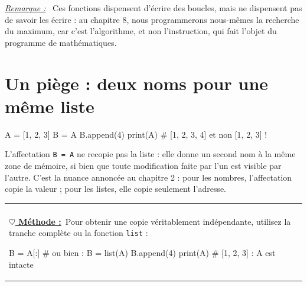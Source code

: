 \documentclass[a4paper,11pt,openany]{book}
\makeatletter
\newcommand{\code}[1]{\texttt{\textcolor{codebleu}{#1}}}
\newenvironment{cadre}%
 {\par\vspace{2mm}\noindent\begin{tabular}{|@{\hspace{4mm}}p{0.93\textwidth}@{\hspace{4mm}}|}
  \hline \\[-2mm]}%
 {\\[2mm] \hline \end{tabular}\par\vspace{3mm}}
\newcommand{\methode}{\textbf{\underline{$\heartsuit$ Méthode :}}~}
\newenvironment{remarque}%
 {\par\vspace{1mm}\begin{list}{}{\leftmargin=1cm \rightmargin=0.5cm}\item[]%
  \textit{\underline{Remarque :}}~}%
 {\end{list}\vspace{1mm}}
\makeatother
\begin{document}
\begin{remarque}
Ces fonctions dispensent d'écrire des boucles, mais ne dispensent pas de savoir les écrire : au chapitre 8, nous programmerons nous-mêmes la recherche du maximum, car c'est l'algorithme, et non l'instruction, qui fait l'objet du programme de mathématiques.
\end{remarque}

\section{Un piège : deux noms pour une même liste}

\begin{python}
A = [1, 2, 3]
B = A
B.append(4)
print(A)      # [1, 2, 3, 4] et non [1, 2, 3] !
\end{python}

\begin{center}
\end{center}

L'affectation \code{B = A} ne recopie pas la liste : elle donne un second nom à la même zone de mémoire, si bien que toute modification faite par l'un est visible par l'autre. C'est la nuance annoncée au chapitre 2 : pour les nombres, l'affectation copie la valeur ; pour les listes, elle copie seulement l'adresse.

\begin{cadre}
\methode Pour obtenir une copie véritablement indépendante, utilisez la tranche complète ou la fonction \code{list} :
\begin{python}
B = A[:]          # ou bien : B = list(A)
B.append(4)
print(A)          # [1, 2, 3] : A est intacte
\end{python}
\end{cadre}
\end{document}

